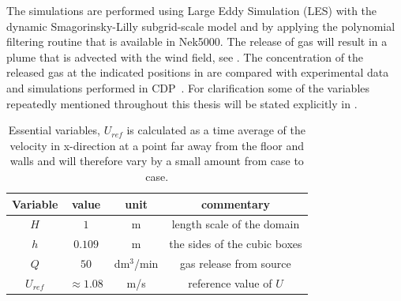 The simulations are performed using Large Eddy Simulation (LES) 
with the dynamic Smagorinsky-Lilly subgrid-scale model and by applying the polynomial filtering
routine that is available in Nek5000. 
The release of gas will result in a plume that is advected with the wind field,
see . The concentration of the released gas at the 
indicated positions in  are compared with 
experimental data and simulations performed in CDP~\cite{CDP}. 
For clarification some of the variables repeatedly mentioned throughout this thesis will be 
stated explicitly in .
\begin{table}
    \centering
    \begin{tabular}{c c c c}
        Variable & value & unit & commentary \\ \hline
        $H$   & $1$ & m & length scale of the domain \\ 
        $h$   & $0.109$ & m & the sides of the cubic boxes\\ 
        $Q$   & $50$ & dm$^3$/min & gas release from source \\ 
        $U_{ref} $& $\approx1.08$ & m/s & reference value of $U$ \\
    \end{tabular}
    \caption{Essential variables, $U_{ref}$ is calculated as a time average of the velocity in 
        x-direction at a point far away from the floor and walls and will therefore 
        vary by a small amount from case to case. }
    \label{tab:simplevariables}
\end{table}

